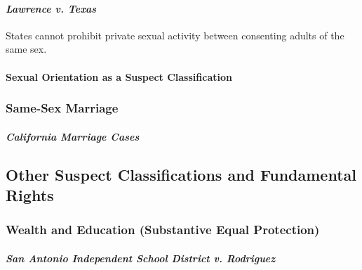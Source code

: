 \paragraph{\emph{Lawrence v. Texas}}

States cannot prohibit private sexual activity between consenting adults of 
the same sex.
 
\paragraph{Sexual Orientation as a Suspect Classification}
 
\subsubsection{Same-Sex Marriage}

\paragraph{\emph{California Marriage Cases}}
 
\subsection{Other Suspect Classifications and Fundamental Rights}
 
\subsubsection{Wealth and Education (Substantive Equal Protection)}

\paragraph{\emph{San Antonio Independent School District v. Rodriguez}}

